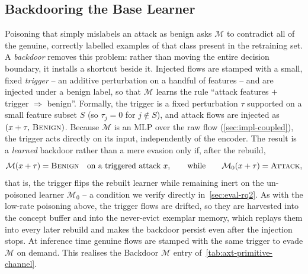 \subsection{Backdooring the Base Learner}
\label{sec:impl-backdoor}
Poisoning that simply mislabels an attack as benign asks $\mathcal{M}$ to contradict all of the genuine, correctly labelled examples of that class present in the retraining set. A \emph{backdoor} removes this problem: rather than moving the entire decision boundary, it installs a shortcut beside it. Injected flows are stamped with a small, fixed \emph{trigger} -- an additive perturbation on a handful of features -- and are injected under a benign label, so that $\mathcal{M}$ learns the rule ``attack features $+$ trigger $\Rightarrow$ benign''. Formally, the trigger is a fixed perturbation $\tau$ supported on a small feature subset $S$ (so $\tau_j = 0$ for $j \notin S$), and attack flows are injected as $(x + \tau,\, \textsc{Benign})$. Because $\mathcal{M}$ is an MLP over the raw flow (\cref{sec:impl-coupled}), the trigger acts directly on its input, independently of the encoder. The result is a \emph{learned} backdoor rather than a mere evasion only if, after the rebuild,
\begin{equation} \label{eq:backdoor}
\mathcal{M}(x + \tau) = \textsc{Benign} \quad \text{on a triggered attack } x, \qquad \text{while} \qquad \mathcal{M}_0(x + \tau) = \textsc{Attack},
\end{equation}
that is, the trigger flips the rebuilt learner while remaining inert on the un-poisoned learner $\mathcal{M}_0$ -- a condition we verify directly in~\cref{sec:eval-rq2}. As with the low-rate poisoning above, the trigger flows are drifted, so they are harvested into the concept buffer and into the never-evict exemplar memory, which replays them into every later rebuild and makes the backdoor persist even after the injection stops. At inference time genuine flows are stamped with the same trigger to evade $\mathcal{M}$ on demand. This realises the Backdoor $\mathcal{M}$ entry of~\cref{tab:axt-primitive-channel}.

